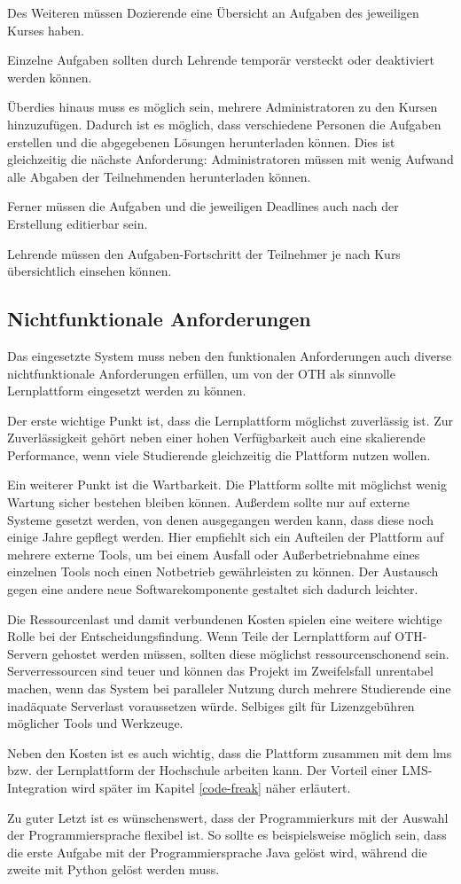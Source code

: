 Des Weiteren müssen Dozierende eine Übersicht an Aufgaben des jeweiligen Kurses
haben.

Einzelne Aufgaben sollten durch Lehrende temporär versteckt oder deaktiviert
werden können.

Überdies hinaus muss es möglich sein, mehrere Administratoren zu den Kursen
hinzuzufügen. Dadurch ist es möglich, dass verschiedene Personen die Aufgaben
erstellen und die abgegebenen Lösungen herunterladen können. Dies ist
gleichzeitig die nächste Anforderung: Administratoren müssen mit wenig
Aufwand alle Abgaben der Teilnehmenden herunterladen können.

Ferner müssen die Aufgaben und die jeweiligen Deadlines auch nach der Erstellung
editierbar sein.

Lehrende müssen den Aufgaben-Fortschritt der Teilnehmer je nach Kurs 
übersichtlich einsehen können.

\subsection{Nichtfunktionale Anforderungen}
\label{anforderungsanalyse-nichtfunktional}
Das eingesetzte System muss neben den funktionalen Anforderungen auch diverse
nichtfunktionale Anforderungen erfüllen, um von der OTH als sinnvolle
Lernplattform eingesetzt werden zu können.

Der erste wichtige Punkt ist, dass die Lernplattform möglichst zuverlässig ist.
Zur Zuverlässigkeit gehört neben einer hohen Verfügbarkeit auch eine skalierende
Performance, wenn viele Studierende gleichzeitig die Plattform nutzen wollen.

Ein weiterer Punkt ist die Wartbarkeit. Die Plattform sollte mit möglichst wenig
Wartung sicher bestehen bleiben können. Außerdem sollte nur auf externe Systeme
gesetzt werden, von denen ausgegangen werden kann, dass diese noch einige Jahre
gepflegt werden. Hier empfiehlt sich ein Aufteilen der Plattform auf mehrere
externe Tools, um bei einem Ausfall oder Außerbetriebnahme eines einzelnen Tools
noch einen Notbetrieb gewährleisten zu können. Der Austausch gegen eine andere
neue Softwarekomponente gestaltet sich dadurch leichter.

Die Ressourcenlast und damit verbundenen Kosten spielen eine weitere wichtige
Rolle bei der Entscheidungsfindung. Wenn Teile der Lernplattform auf OTH-Servern
gehostet werden müssen, sollten diese möglichst ressourcenschonend sein.
Serverressourcen sind teuer und können das Projekt im Zweifelsfall unrentabel
machen, wenn das System bei paralleler Nutzung durch mehrere Studierende eine
inadäquate Serverlast voraussetzen würde. Selbiges gilt für Lizenzgebühren
möglicher Tools und Werkzeuge.

Neben den Kosten ist es auch wichtig, dass die Plattform zusammen mit dem
\ac{lms} bzw. der Lernplattform der Hochschule arbeiten kann. Der Vorteil einer
LMS-Integration wird später im Kapitel \ref{code-freak} näher erläutert.

Zu guter Letzt ist es wünschenswert, dass der Programmierkurs mit der Auswahl
der Programmiersprache flexibel ist. So sollte es beispielsweise möglich sein,
dass die erste Aufgabe mit der Programmiersprache Java gelöst wird,
während die zweite mit Python gelöst werden muss.